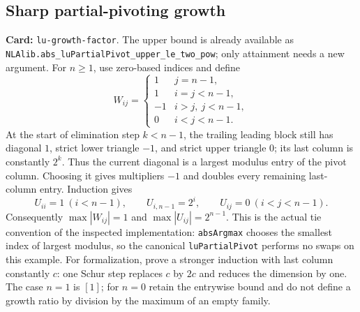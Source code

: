 \documentclass[11pt,a4paper]{article}
\DeclareRobustCommand{\code}[1]{{\footnotesize\urlstyle{tt}\nolinkurl{#1}}}
\begin{document}
\subsection{Sharp partial-pivoting growth}
\label{route:lu-growth-factor}
\textbf{Card:} \code{lu-growth-factor}.
The upper bound is already available as
\code{NLAlib.abs_luPartialPivot_upper_le_two_pow}; only attainment needs a new argument.
For $n\ge1$, use zero-based indices and define
\[
 W_{ij}=\begin{cases}1&j=n-1,\\1&i=j<n-1,\\-1&i>j,\ j<n-1,\\0&i<j<n-1.\end{cases}
\]
At the start of elimination step $k<n-1$, the trailing leading block still
has diagonal $1$, strict lower triangle $-1$, and strict upper triangle $0$;
its last column is constantly $2^k$. Thus the current diagonal is a largest
modulus entry of the pivot column. Choosing it gives multipliers $-1$ and
doubles every remaining last-column entry. Induction gives
\[
 U_{ii}=1\ (i<n-1),\qquad U_{i,n-1}=2^i,
 \qquad U_{ij}=0\ (i<j<n-1).
\]
Consequently $\max|W_{ij}|=1$ and $\max|U_{ij}|=2^{n-1}$.
This is the actual tie convention of the inspected implementation:
\code{absArgmax} chooses the smallest index of largest modulus, so the
canonical \code{luPartialPivot} performs no swaps on this example.
For formalization, prove a stronger induction with last column constantly
$c$: one Schur step replaces $c$ by $2c$ and reduces the dimension by one.
The case $n=1$ is $[1]$; for $n=0$ retain the entrywise bound and do not
define a growth ratio by division by the maximum of an empty family.
\end{document}
